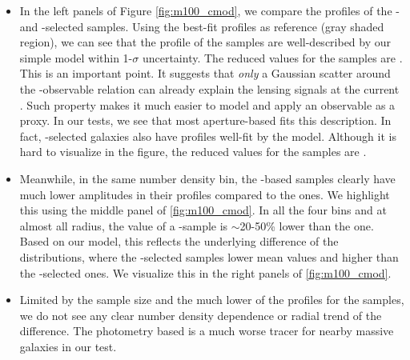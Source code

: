 \documentclass[a4paper,fleqn,usenatbib]{mnras}
\begin{document}
    \begin{itemize}
        
        \item In the left panels of Figure \ref{fig:m100_cmod}, we compare the \rdsigma{} profiles
            of the \mcmodel{}- and -selected samples. 
            Using the best-fit profiles as reference (gray shaded region), we can see that the 
            \dsigma{} profile of the  samples are well-described by our simple model 
            within 1-$\sigma$ uncertainty. 
            The reduced \chisq{} values for the \maper{} samples are \todo{[XX, XX, XX, XX]}.
            This is an important point. It suggests that \emph{only} a Gaussian scatter around 
            the \mvir{}-observable relation can already explain the lensing signals at  
            the current \snratio{}.
            Such property makes it much easier to model and apply an observable as a \mvir{} proxy.
            In our tests, we see that most aperture-based \mstar{} fits this description. 
            In fact, \cmodel{}-selected galaxies also have \dsigma{} profiles well-fit by the model.
            Although it is hard to visualize in the figure, the reduced \chisq{} values for the 
            \mcmodel{} samples are \todo{[XX, XX, XX, XX]}.
        
        \item Meanwhile, in the same number density bin, the \mcmodel{}-based samples clearly have 
            much lower amplitudes in their \dsigma{} profiles compared to the  ones.
            We highlight this using the middle panel of \ref{fig:m100_cmod}. 
            In all the four bins and at almost all radius, the \dsigma{} value of a \mcmodel{}-sample
            is $\sim$20-50\% lower than the  one.
            Based on our model, this reflects the underlying difference of the \mvir{} distributions,
            where the \mcmodel{}-selected samples lower mean \mvir{} values and higher \sighalo{}
            than the -selected ones. 
            We visualize this in the right panels of \ref{fig:m100_cmod}.
        
        \item Limited by the sample size and the much lower \snratio{} of the \dsigma{} profiles 
            for the \mcmodel{} samples, we do not see any clear number density dependence or radial 
            trend of the difference.
            The \cmodel{} photometry based \mstar{} is a much worse \mvir{} tracer for nearby 
            massive galaxies in our test.
        

\end{itemize}
\end{document}
